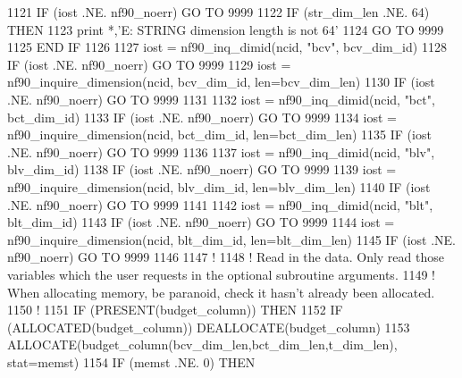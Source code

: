 \begin{DoxyCode}
1121     \textcolor{keywordflow}{IF} (iost .NE. nf90\_noerr) \textcolor{keywordflow}{GO TO} 9999
1122     \textcolor{keywordflow}{IF} (str\_dim\_len .NE. 64) \textcolor{keywordflow}{THEN}
1123         print *,\textcolor{stringliteral}{'E: STRING dimension length is not 64'}
1124         \textcolor{keywordflow}{GO TO} 9999
1125 \textcolor{keywordflow}{    END IF}
1126 
1127     iost    = nf90\_inq\_dimid(ncid, \textcolor{stringliteral}{"bcv"}, bcv\_dim\_id)
1128     \textcolor{keywordflow}{IF} (iost .NE. nf90\_noerr) \textcolor{keywordflow}{GO TO} 9999
1129     iost    = nf90\_inquire\_dimension(ncid, bcv\_dim\_id, len=bcv\_dim\_len)
1130     \textcolor{keywordflow}{IF} (iost .NE. nf90\_noerr) \textcolor{keywordflow}{GO TO} 9999
1131 
1132     iost    = nf90\_inq\_dimid(ncid, \textcolor{stringliteral}{"bct"}, bct\_dim\_id)
1133     \textcolor{keywordflow}{IF} (iost .NE. nf90\_noerr) \textcolor{keywordflow}{GO TO} 9999
1134     iost    = nf90\_inquire\_dimension(ncid, bct\_dim\_id, len=bct\_dim\_len)
1135     \textcolor{keywordflow}{IF} (iost .NE. nf90\_noerr) \textcolor{keywordflow}{GO TO} 9999
1136 
1137     iost    = nf90\_inq\_dimid(ncid, \textcolor{stringliteral}{"blv"}, blv\_dim\_id)
1138     \textcolor{keywordflow}{IF} (iost .NE. nf90\_noerr) \textcolor{keywordflow}{GO TO} 9999
1139     iost    = nf90\_inquire\_dimension(ncid, blv\_dim\_id, len=blv\_dim\_len)
1140     \textcolor{keywordflow}{IF} (iost .NE. nf90\_noerr) \textcolor{keywordflow}{GO TO} 9999
1141 
1142     iost    = nf90\_inq\_dimid(ncid, \textcolor{stringliteral}{"blt"}, blt\_dim\_id)
1143     \textcolor{keywordflow}{IF} (iost .NE. nf90\_noerr) \textcolor{keywordflow}{GO TO} 9999
1144     iost    = nf90\_inquire\_dimension(ncid, blt\_dim\_id, len=blt\_dim\_len)
1145     \textcolor{keywordflow}{IF} (iost .NE. nf90\_noerr) \textcolor{keywordflow}{GO TO} 9999
1146 
1147     \textcolor{comment}{!}
1148     \textcolor{comment}{! Read in the data. Only read those variables which the user requests in the optional subroutine
       arguments.}
1149     \textcolor{comment}{! When allocating memory, be paranoid, check it hasn't already been allocated.}
1150     \textcolor{comment}{!}
1151     \textcolor{keywordflow}{IF} (\textcolor{keyword}{PRESENT}(budget\_column)) \textcolor{keywordflow}{THEN}
1152         \textcolor{keywordflow}{IF} (\textcolor{keyword}{ALLOCATED}(budget\_column))          \textcolor{keyword}{DEALLOCATE}(budget\_column)
1153         \textcolor{keyword}{ALLOCATE}(budget\_column(bcv\_dim\_len,bct\_dim\_len,t\_dim\_len), stat=memst)
1154         \textcolor{keywordflow}{IF} (memst .NE. 0) \textcolor{keywordflow}{THEN}

\end{DoxyCode}
